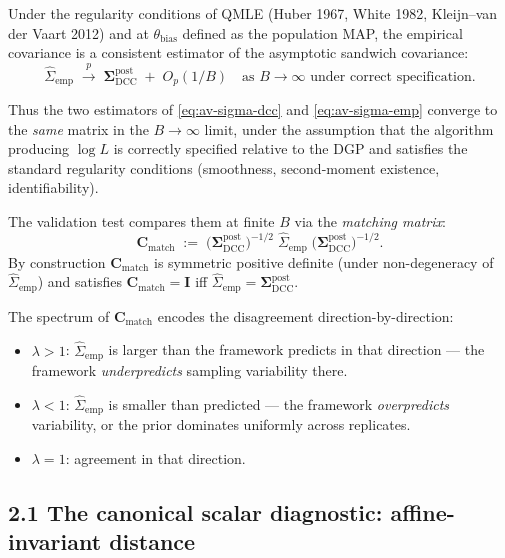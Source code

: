 \documentclass[11pt]{article}
\begin{document}
Under the regularity conditions of QMLE (Huber 1967, White 1982,
Kleijn--van der Vaart 2012) and at $\theta_{\mathrm{bias}}$ defined as
the population MAP, the empirical covariance is a consistent
estimator of the asymptotic sandwich covariance:
\begin{equation}
\widehat\Sigma_{\mathrm{emp}}
\;\xrightarrow{p}\;
\boldsymbol\Sigma_{\mathrm{DCC}}^{\mathrm{post}}\;+\;O_p(1/B)
\quad\text{as } B\to\infty\text{ under correct specification.}
\label{eq:av-consistency}
\end{equation}

Thus the two estimators of \eqref{eq:av-sigma-dcc} and
\eqref{eq:av-sigma-emp} converge to the \emph{same} matrix in the
$B \to \infty$ limit, under the assumption that the algorithm
producing $\log L$ is correctly specified relative to the DGP and
satisfies the standard regularity conditions (smoothness, second-moment
existence, identifiability).

The validation test compares them at finite $B$ via the
\emph{matching matrix}:
\begin{equation}
\mathbf C_{\mathrm{match}}
\;:=\;
\bigl(\boldsymbol\Sigma_{\mathrm{DCC}}^{\mathrm{post}}\bigr)^{-1/2}\;
\widehat\Sigma_{\mathrm{emp}}\;
\bigl(\boldsymbol\Sigma_{\mathrm{DCC}}^{\mathrm{post}}\bigr)^{-1/2}.
\label{eq:av-C-match}
\end{equation}
By construction $\mathbf C_{\mathrm{match}}$ is symmetric positive
definite (under non-degeneracy of $\widehat\Sigma_{\mathrm{emp}}$) and
satisfies $\mathbf C_{\mathrm{match}} = \mathbf I$ iff
$\widehat\Sigma_{\mathrm{emp}} = \boldsymbol\Sigma_{\mathrm{DCC}}^{\mathrm{post}}$.

The spectrum of $\mathbf C_{\mathrm{match}}$ encodes the disagreement
direction-by-direction:
\begin{itemize}
\item $\lambda > 1$: $\widehat\Sigma_{\mathrm{emp}}$ is larger than
  the framework predicts in that direction --- the framework
  \emph{underpredicts} sampling variability there.
\item $\lambda < 1$: $\widehat\Sigma_{\mathrm{emp}}$ is smaller than
  predicted --- the framework \emph{overpredicts} variability, or the
  prior dominates uniformly across replicates.
\item $\lambda = 1$: agreement in that direction.
\end{itemize}

\subsection*{2.1 The canonical scalar diagnostic: affine-invariant distance}
\label{sec:av-canonical-scalar}
\end{document}
